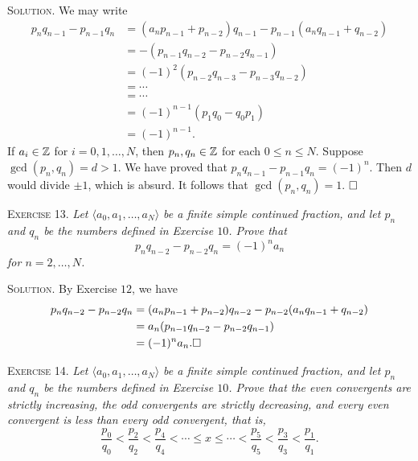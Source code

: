 \documentclass[11pt, leqno]{article}
\newcommand{\done}{\ensuremath{\hfill\square}}
\begin{document}
\textsc{Solution}. We may write 
\begin{align*}
  p_nq_{n-1} - p_{n-1}q_n &= (a_np_{n-1} + p_{n-2})q_{n-1} - p_{n-1}(a_nq_{n-1}+q_{n-2}) \\
                          &= -(p_{n-1}q_{n-2} - p_{n-2}q_{n-1}) \\
                          &= (-1)^2 (p_{n-2}q_{n-3} - p_{n-3}q_{n-2}) \\
                          &= \cdots \\
                          &= \cdots \\
                          &= (-1)^{n-1} (p_1q_0 - q_0p_1) \\
                          &= (-1)^{n-1}.
\end{align*}
If $a_i \in \mathbb{Z}$ for $i = 0, 1, \ldots, N$, then $p_n, q_n \in \mathbb{Z}$ for each $0 \leq n \leq N$. Suppose $\gcd(p_n, q_n) = d > 1$. We have proved that $p_nq_{n-1} - p_{n-1}q_n = (-1)^n$.  Then $d$ would divide $\pm 1$, which is absurd. It follows that $\gcd(p_n, q_n) = 1$. \done

\textsc{Exercise 13}. \emph{Let $\langle a_0, a_1, \ldots, a_N\rangle$ be a finite simple continued fraction, and let $p_n$ and $q_n$ be the numbers defined in Exercise $10$. Prove that 
\begin{displaymath}
p_nq_{n-2} - p_{n-2}q_n = (-1)^n a_n
\end{displaymath}for $n=2,\ldots, N$.}

\textsc{Solution}. By Exercise $12$, we have 
\begin{align*}
  p_nq_{n-2} - p_{n-2}q_n &= (a_np_{n-1}+ p_{n-2})q_{n-2} - p_{n-2}(a_nq_{n-1} + q_{n-2}) \\
                          &= a_n(p_{n-1}q_{n-2} - p_{n-2}q_{n-1})\\
  &= (-1)^n a_n. \done
\end{align*}

\textsc{Exercise 14}. \emph{Let $\langle a_0, a_1, \ldots, a_N\rangle$ be a finite simple continued fraction, and let $p_n$ and $q_n$ be the numbers defined in Exercise $10$. Prove that the even convergents are strictly increasing, the odd convergents are strictly decreasing, and every even convergent is less than every odd convergent, that is, 
\begin{displaymath}
\frac{p_0}{q_0} < \frac{p_2}{q_2} < \frac{p_4}{q_4} < \cdots \leq x \leq \cdots < \frac{p_5}{q_5} < \frac{p_3}{q_3} < \frac{p_1}{q_1}.
\end{displaymath}}
\end{document}
